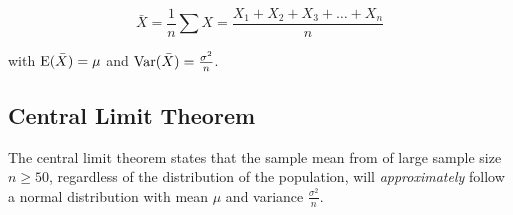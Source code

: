 \documentclass[../main]{subfiles}
\begin{document}
	\[	\bar{X} = \frac{1}{n} \sum X = \frac{X_1 + X_2 + X_3 + \dots + X_n}{n} \]

	with \(\operatorname{E}(\bar{X}) = \mu\) and \(\operatorname{Var}(\bar{X}) = \frac{\sigma^2}{n}\).

	\subsection{Central Limit Theorem}

	The central limit theorem states that the sample mean from of large sample size \(n \geq 50\), regardless of the distribution of the population, will \emph{approximately} follow a normal distribution with mean \(\mu\) and variance \(\frac{\sigma^2}{n}\). 
\end{document}
